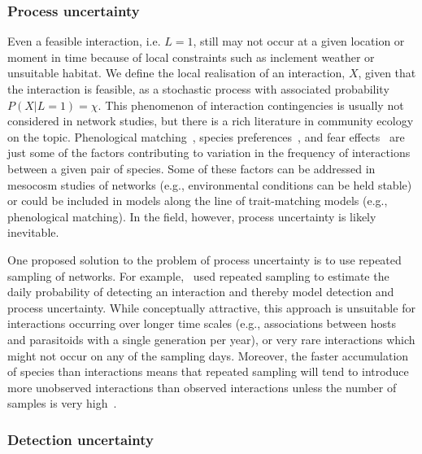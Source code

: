 \documentclass[12pt]{article}
\begin{document}
\begin{spacing}{2.0}
        \subsubsection*{Process uncertainty} 

         Even a feasible interaction, i.e. $L=1$, still may not occur at a given location or moment in time because of local constraints such as inclement weather or unsuitable habitat. We define the local realisation of an interaction, $X$, given that the interaction is feasible, as a stochastic process with associated probability $P(X|L=1)=\chi$. This phenomenon of interaction contingencies is usually not considered in network studies, but there is a rich literature in community ecology  on the topic. Phenological matching~\citep{MillerRushing2010,Gezon2016}, species preferences~\citep{Pires2011,Novak2015,Coux2016}, and fear effects~\citep{Luttbeg2005,Wirsing2008} are just some of the factors contributing to variation in the frequency of interactions between a given pair of species. Some of these factors can be addressed in mesocosm studies of networks (e.g., environmental conditions can be held stable) or could be included in models along the line of trait-matching models (e.g., phenological matching). In the field, however, process uncertainty is likely inevitable.


         One proposed solution to the problem of process uncertainty is to use repeated sampling of networks. For example,~\citet{Weinstein2017} used repeated sampling to estimate the daily probability of detecting an interaction and thereby model detection and process uncertainty. While conceptually attractive, this approach is unsuitable for interactions occurring over longer time scales (e.g., associations between hosts and parasitoids with a single generation per year), or very rare interactions which might not occur on any of the sampling days. Moreover, the faster accumulation of species than interactions means that repeated sampling will tend to introduce more unobserved interactions than observed interactions unless the number of samples is very high~\citep{Poisot2012}.


        \subsubsection*{Detection uncertainty} 


\end{spacing}
\end{document}
